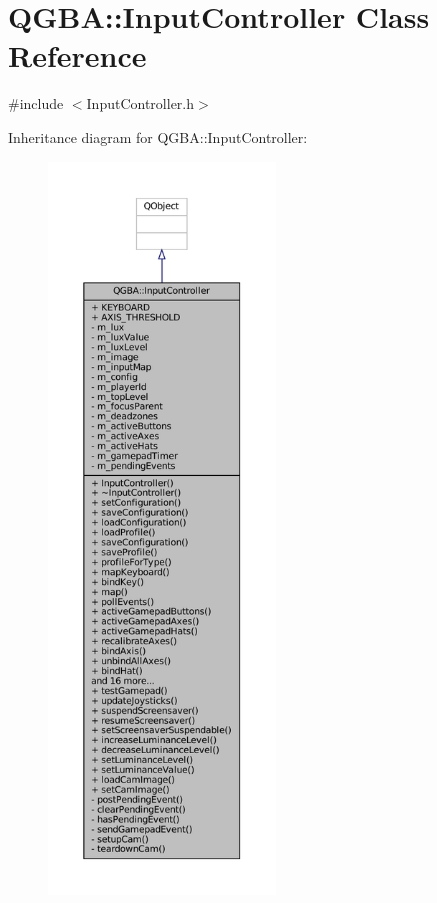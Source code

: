 \hypertarget{class_q_g_b_a_1_1_input_controller}{}\section{Q\+G\+BA\+:\+:Input\+Controller Class Reference}
\label{class_q_g_b_a_1_1_input_controller}


{\ttfamily \#include $<$Input\+Controller.\+h$>$}



Inheritance diagram for Q\+G\+BA\+:\+:Input\+Controller\+:
\nopagebreak
\begin{figure}[H]
\begin{center}
\leavevmode
\includegraphics[height=550pt]{class_q_g_b_a_1_1_input_controller__inherit__graph}
\end{center}
\end{figure}


